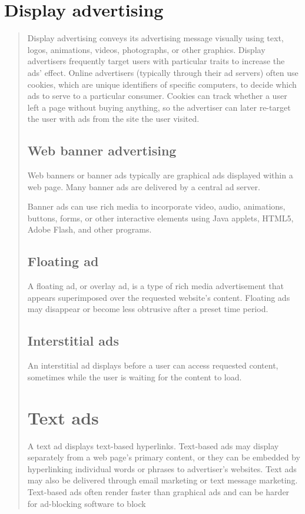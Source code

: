 \documentclass[35pt]{report}
\begin{document}
		\section{Display advertising}
\begin{quote}
Display advertising conveys its advertising message visually using text, logos, animations, videos, photographs, or other graphics. Display advertisers frequently target users with particular traits to increase the ads' effect. Online advertisers (typically through their ad servers) often use cookies, which are unique identifiers of specific computers, to decide which ads to serve to a particular consumer. Cookies can track whether a user left a page without buying anything, so the advertiser can later re-target the user with ads from the site the user visited.

			\subsection{Web banner advertising}
Web banners or banner ads typically are graphical ads displayed within a web page. Many banner ads are delivered by a central ad server.

Banner ads can use rich media to incorporate video, audio, animations, buttons, forms, or other interactive elements using Java applets, HTML5, Adobe Flash, and other programs.

			\subsection{Floating ad}
A floating ad, or overlay ad, is a type of rich media advertisement that appears superimposed over the requested website's content. Floating ads may disappear or become less obtrusive after a preset time period.

			\subsection{Interstitial ads}
An interstitial ad displays before a user can access requested content, sometimes while the user is waiting for the content to load.

		\section{Text ads}
A text ad displays text-based hyperlinks. Text-based ads may display separately from a web page's primary content, or they can be embedded by hyperlinking individual words or phrases to advertiser's websites. Text ads may also be delivered through email marketing or text message marketing. Text-based ads often render faster than graphical ads and can be harder for ad-blocking software to block


\end{quote}
\end{document}
